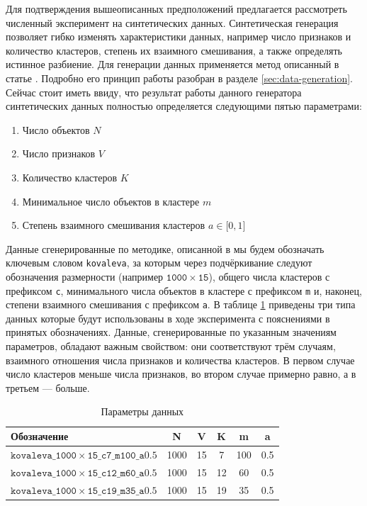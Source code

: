 \documentclass[12pt]{a&t}
\begin{document}
Для подтверждения вышеописанных предположений предлагается рассмотреть численный эксперимент на синтетических данных. Синтетическая генерация позволяет гибко изменять характеристики данных, например число признаков и количество кластеров, степень их взаимного смешивания, а также определять истинное разбиение. Для генерации данных применяется метод описанный в статье \cite{Kovaleva}. Подробно его принцип работы разобран в разделе \ref{sec:data-generation}. Сейчас стоит иметь ввиду, что результат работы данного генератора синтетических данных полностью определяется следующими пятью параметрами:
\begin{enumerate}
	\item
	Число объектов $ N $
	\item
	Число признаков $ V $
	\item
	Количество кластеров $ K $
	\item 
	Минимальное число объектов в кластере $ m $
	\item
	Степень взаимного смешивания кластеров $ a \in \lbrack0,1\rbrack $
\end{enumerate}

Данные сгенерированные по методике, описанной в \cite{Kovaleva} мы будем обозначать ключевым словом \texttt{kovaleva}, за которым через подчёркивание следуют обозначения размерности (например \mbox{$\mathtt{1000 \times 15 } $}), общего числа кластеров с префиксом \texttt{с}, минимального числа объектов в кластере с префиксом \texttt{m} и, наконец, степени взаимного смешивания с префиксом \texttt{a}. В таблице \ref{tab:datasets} приведены три типа данных которые будут использованы в ходе эксперимента с пояснениями в принятых обозначениях. Данные, сгенерированные по указанным значениям параметров, обладают важным свойством: они соответствуют трём случаям, взаимного отношения числа признаков и количества кластеров. В первом случае число кластеров меньше числа признаков, во втором случае примерно равно, а в третьем --- больше.

\begin{table}[h!]
	\centering
	\caption{Параметры данных} \label{tab:datasets}
	\begin{tabular}{ |l|c|c|c|c|c| }
					\hline Обозначение               & N & V & K & m & a\\ 
					\hline $\mathtt{kovaleva\_1000 \times 15\_c7\_m100\_a0.5}$ & 1000 & 15 & 7 & 100 & 0.5\\ 
					\hline $\mathtt{kovaleva\_1000 \times 15\_c12\_m60\_a0.5}$ & 1000 & 15 & 12 & 60 & 0.5\\ 
					\hline $\mathtt{kovaleva\_1000 \times 15\_c19\_m35\_a0.5}$ & 1000 & 15 & 19 & 35 & 0.5\\ 
					\hline
	\end{tabular}
\end{table}
\end{document}
